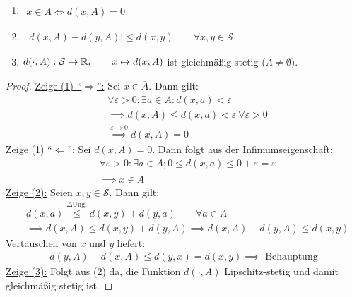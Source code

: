 \begin{lemma}\label{lemma2.3}\ %
	\begin{enumerate}[label={(\arabic*)}]
		\item $\begin{aligned}
			x\in\overline{A}\Longleftrightarrow d(x,A)=0
		\end{aligned}$
		\item $\begin{aligned}
			\big| d(x,A)-d(y,A)\big|\leq d(x,y)\qquad\forall x,y\in\mathcal{S}
		\end{aligned}$
		\item $\begin{aligned}
			d(\cdot, A):\mathcal{S}\to\mathbb{R},\qquad x\mapsto d(x,A)
		\end{aligned}$ ist gleichmäßig stetig ($A\neq\emptyset$).
	\end{enumerate}
\end{lemma}

\begin{proof}
	\underline{Zeige (1) ``$\Rightarrow$'':} Sei $x\in\overline{A}$. Dann gilt:
	\begin{align*}
		&\forall\varepsilon>0:\exists a\in A: d(x,a)<\varepsilon\\
		&\implies d(x,A)\leq d(x,a)<\varepsilon~\forall\varepsilon>0\\
		&\stackrel{\varepsilon\to0}{\implies}
		d(x,A)=0
	\end{align*}
	\underline{Zeige (1) ``$\Leftarrow$'':}
	Sei $d(x,A)=0$. Dann folgt aus der Infimumseigenschaft:
	\begin{align*}
		&\forall\varepsilon>0:\exists a\in A;0\leq d(x,a)\leq0+\varepsilon=\varepsilon\\
		&\implies x\in\overline{A}
	\end{align*}
	\underline{Zeige (2):} Seien $x,y\in\mathcal{S}$. Dann gilt:
	\begin{align*}
		&d(x,a)
		\stackrel{\Delta\text{Ungl}}{\leq}
		d(x,y)+d(y,a)\qquad\forall a\in A\\
		&\implies
		d(x,A)\leq d(x,y)+d(y,A)\implies d(x,A)-d(y,A)\leq d(x,y)
	\end{align*}
	Vertauschen von $x$ und $y$ liefert:
	\begin{align*}
		d(y,A)-d(x,A)\leq d(y,x)=d(x,y)\implies\text{ Behauptung}
	\end{align*}
	\underline{Zeige (3):} Folgt aus (2) da, die Funktion $d(\cdot,A)$ Lipschitz-stetig und damit gleichmäßig stetig ist.
\end{proof}

